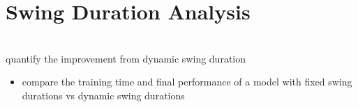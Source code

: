 \section{Swing Duration Analysis}

\begin{todo}\\
  quantify the improvement from dynamic swing duration
  \begin{itemize}
    \item compare the training time and final performance of a model
      with fixed swing durations vs dynamic swing durations
  \end{itemize}
\end{todo}
